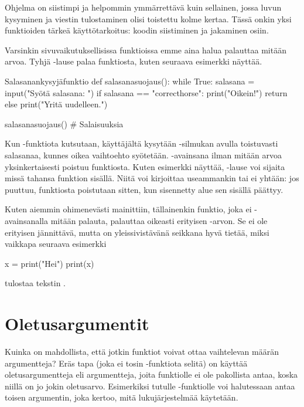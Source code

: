 Ohjelma on siistimpi ja helpommin ymmärrettävä kuin sellainen, jossa luvun kysyminen ja viestin tulostaminen olisi toistettu kolme kertaa. Tässä onkin yksi funktioiden tärkeä käyttötarkoitus: koodin siistiminen ja jakaminen osiin.

Varsinkin sivuvaikutuksellisissa funktioissa emme aina halua palauttaa mitään arvoa. Tyhjä -lause palaa funktiosta, kuten seuraava esimerkki näyttää.

\begin{example}{Salasanankysyjäfunktio}
def salasanasuojaus():
        while True:
                salasana = input("Syötä salasana: ")
                if salasana == "correcthorse":
			print("Oikein!")
                        return
		else
			print("Yritä uudelleen.")

salasanasuojaus()
# Salaisuuksia

\end{example}

Kun -funktiota kutsutaan, käyttäjältä kysytään -silmukan avulla toistuvasti salasanaa, kunnes oikea vaihtoehto syötetään. -avainsana ilman mitään arvoa yksinkertaisesti poistuu funktiosta. Kuten esimerkki näyttää, -lause voi sijaita missä tahansa funktion sisällä. Niitä voi kirjoittaa useammankin tai ei yhtään: jos  puuttuu, funktiosta poistutaan sitten, kun sisennetty alue sen sisällä päättyy.

Kuten aiemmin ohimenevästi mainittiin, tällainenkin funktio, joka ei -avainsanalla mitään palauta, palauttaa oikeasti erityisen -arvon. Se ei ole erityisen jännittävä, mutta on yleissivistävänä seikkana hyvä tietää, miksi vaikkapa seuraava esimerkki

\begin{python}
x = print("Hei")
print(x)
\end{python}

tulostaa tekstin .

\section{Oletusargumentit}

Kuinka on mahdollista, että jotkin funktiot voivat ottaa vaihtelevan määrän argumentteja? Eräs tapa (joka ei tosin -funktiota selitä) on käyttää oletusargumentteja eli argumentteja, joita funktiolle ei ole pakollista antaa, koska niillä on jo jokin oletusarvo. Esimerkiksi tutulle -funktiolle voi halutessaan antaa toisen argumentin, joka kertoo, mitä lukujärjestelmää käytetään.

